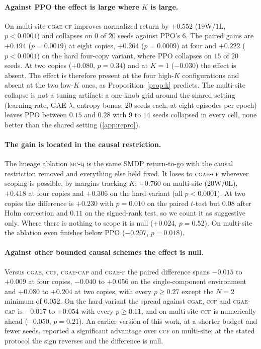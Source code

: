 \documentclass[review,authoryear,3p,times]{elsarticle}
\newcommand{\cgae}{\textsc{cgae}}              %
\newcommand{\cflow}{\textsc{cgae-cf}}          %
\newcommand{\cflowraw}{\textsc{cgae-f}}        %
\newcommand{\ccap}{\textsc{cgae-cap}}          %
\newcommand{\ccf}{\textsc{ccf}}
\newcommand{\mcq}{\textsc{mc-q}}
\begin{document}
\paragraph{Against PPO the effect is large where $K$ is large.} On multi-site
\cflow{} improves normalized return by $+0.552$ ($19$W/$1$L, $p<0.0001$) and
collapses on $0$ of $20$ seeds against PPO's $6$. The paired gains are $+0.194$
($p=0.0019$) at eight copies, $+0.264$ ($p=0.0009$) at four and $+0.222$
($p<0.0001$) on the hard four-copy variant, where PPO collapses on $15$ of $20$
seeds. At two copies ($+0.080$, $p=0.34$) and at $K{=}1$ ($-0.030$) the effect
is absent. The effect is therefore present at the four high-$K$ configurations
and absent at the two low-$K$ ones, as Proposition~\ref{prop:k} predicts. The
multi-site collapse is not a tuning artifact: a one-knob grid around the shared
setting (learning rate, GAE $\lambda$, entropy bonus; $20$ seeds each, at
eight episodes per epoch) leaves PPO between $0.15$ and $0.28$ with $9$ to $14$
seeds collapsed in every cell, none better than the shared setting
(\ref{app:repro}).

\paragraph{The gain is located in the causal restriction.} The lineage
ablation \mcq{} is the same SMDP return-to-go with the causal restriction
removed and everything else held fixed. It loses to \cflow{} wherever scoping
is possible, by margins tracking $K$: $+0.760$ on multi-site ($20$W/$0$L),
$+0.418$ at four copies and $+0.306$ on the hard variant (all $p<0.0001$). At
two copies the difference is $+0.230$ with $p=0.010$ on the paired $t$-test but
$0.08$ after Holm correction and $0.11$ on the signed-rank test, so we count it
as suggestive only. Where there is nothing to scope it is null ($+0.024$,
$p=0.52$). On multi-site the ablation even finishes below PPO ($-0.207$,
$p=0.018$).

\paragraph{Against other bounded causal schemes the effect is null.} Versus
\cgae{}, \ccf{}, \ccap{} and \cflowraw{} the paired difference spans $-0.015$
to $+0.009$ at four copies, $-0.040$ to $+0.056$ on the single-component
environment and $+0.080$ to $+0.204$ at two copies, with every $p\ge0.27$
except the $N{=}2$ minimum of $0.052$. On the hard variant the spread against
\cgae, \ccf{} and \ccap{} is $-0.017$ to $+0.054$ with every $p\ge0.11$, and
on multi-site \ccf{} is numerically ahead ($-0.050$, $p=0.21$). An earlier
version of this work, at a shorter budget and fewer seeds, reported a
significant advantage over \ccf{} on multi-site; at the stated protocol the
sign reverses and the difference is null.
\end{document}
